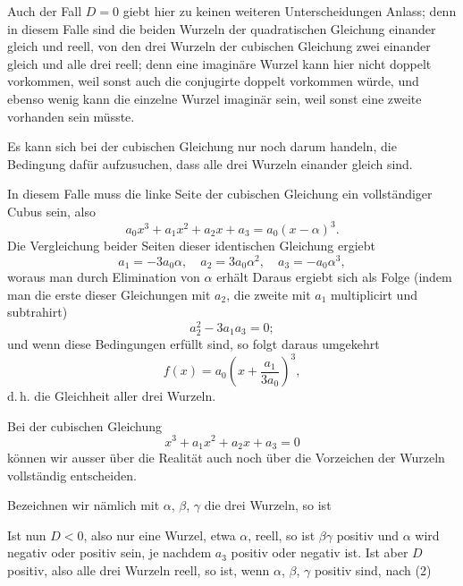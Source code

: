
Auch der Fall $D=0$ giebt hier zu keinen weiteren Unterscheidungen Anlass; denn in diesem Falle sind die beiden Wurzeln der quadratischen Gleichung einander gleich und reell, von den drei Wurzeln der cubischen Gleichung zwei einander gleich und alle drei reell; denn eine imaginäre Wurzel kann hier nicht doppelt vorkommen, weil sonst auch die conjugirte doppelt vorkommen würde, und ebenso wenig kann die einzelne Wurzel imaginär sein, weil sonst eine zweite vorhanden sein müsste.

Es kann sich bei der cubischen Gleichung nur noch darum handeln, die Bedingung dafür aufzusuchen, dass alle drei Wurzeln einander gleich sind.

In diesem Falle muss die linke Seite der cubischen Gleichung ein vollständiger Cubus sein, also
\[
a_0 x^3 + a_1 x^2 + a_2 x + a_3 = a_0 (x - \alpha)^3.
\]
Die Vergleichung beider Seiten dieser identischen Gleichung ergiebt
\[
a_1 = -3a_0\alpha, \quad a_2 = 3a_0\alpha^2, \quad a_3 = -a_0\alpha^3,
\]
woraus man durch Elimination von $\alpha$ erhält
Daraus ergiebt sich als Folge (indem man die erste dieser Gleichungen mit $a_2$, die zweite mit $a_1$ multiplicirt und subtrahirt)
\[
a_2^2 - 3a_1a_3 = 0;
\]
und wenn diese Bedingungen erfüllt sind, so folgt daraus umgekehrt
\[
f(x) = a_0\left(x + \frac{a_1}{3a_0}\right)^3,
\]
d.\,h. die Gleichheit aller drei Wurzeln.

Bei der cubischen Gleichung
\[
x^3 + a_1 x^2 + a_2 x + a_3 = 0
\]
können wir ausser über die Realität auch noch über die Vorzeichen der Wurzeln vollständig entscheiden.

Bezeichnen wir nämlich mit $\alpha$, $\beta$, $\gamma$ die drei Wurzeln, so ist

Ist nun $D<0$, also nur eine Wurzel, etwa $\alpha$, reell, so ist $\beta\gamma$ positiv und $\alpha$ wird negativ oder positiv sein, je nachdem $a_3$ positiv oder negativ ist. Ist aber $D$ positiv, also alle drei Wurzeln reell, so ist, wenn $\alpha$, $\beta$, $\gamma$ positiv sind, nach (2)
